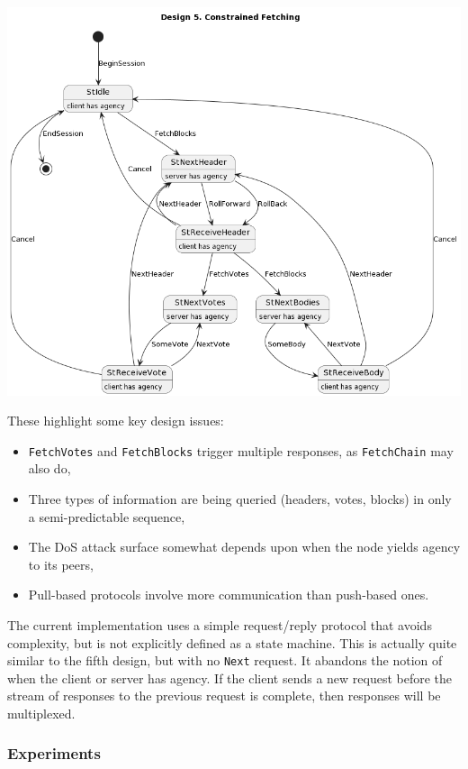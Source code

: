 \documentclass[10pt]{article}
\providecommand{\tightlist}{%
  \setlength{\itemsep}{0pt}\setlength{\parskip}{0pt}}
\begin{document}
\begin{longtable}[]
\includegraphics{../diagrams/sim-expts/protocol-5.png} \\
\end{longtable}

These highlight some key design issues:

\begin{itemize}
\tightlist
\item
  \texttt{FetchVotes} and \texttt{FetchBlocks} trigger multiple
  responses, as \texttt{FetchChain} may also do,
\item
  Three types of information are being queried (headers, votes, blocks)
  in only a semi-predictable sequence,
\item
  The DoS attack surface somewhat depends upon when the node yields
  agency to its peers,
\item
  Pull-based protocols involve more communication than push-based ones.
\end{itemize}

The current implementation uses a simple request/reply protocol that
avoids complexity, but is not explicitly defined as a state machine.
This is actually quite similar to the fifth design, but with no
\texttt{Next} request. It abandons the notion of when the client or
server has agency. If the client sends a new request before the stream
of responses to the previous request is complete, then responses will be
multiplexed.

\subsubsection{Experiments}\label{experiments}
\end{document}
